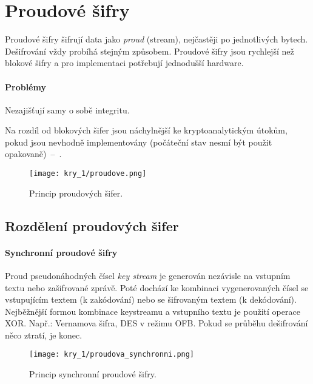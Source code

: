 
\section{Proudové šifry}

Proudové šifry šifrují data jako \textit{proud} (stream), nejčastěji po jednotlivých bytech. Dešifrování vždy probíhá stejným způsobem. Proudové šifry jsou rychlejší než blokové šifry a pro implementaci potřebují jednodušší hardware.

\paragraph*{Problémy} \begin{compactitem}
    \item Nezajišťují samy o sobě integritu.
    \item Na rozdíl od blokových šifer jsou náchylnější ke kryptoanalytickým útokům, pokud jsou nevhodně implementovány (počáteční stav nesmí být použit opakovaně)~--~.
\end{compactitem}

\begin{figure}[H]
    \centering
    \texttt{[image: kry\_1/proudove.png]}
    \caption{Princip proudových šifer.}
\end{figure}

\subsection*{Rozdělení proudových šifer}

\paragraph*{Synchronní proudové šifry} Proud pseudonáhodných čísel \textit{key stream} je generován nezávisle na vstupním textu nebo zašifrované zprávě. Poté dochází ke kombinaci vygenerovaných čísel se vstupujícím textem (k zakódování) nebo se šifrovaným textem (k dekódování). Nejběžnější formou kombinace keystreamu a vstupního textu je použití operace XOR. Např.: Vernamova šifra, DES v režimu OFB. Pokud se průběhu dešifrování něco ztratí, je konec.

\begin{figure}[H]
    \centering
    \texttt{[image: kry\_1/proudova\_synchronni.png]}
    \caption{Princip synchronní proudové šifry.}
\end{figure}


